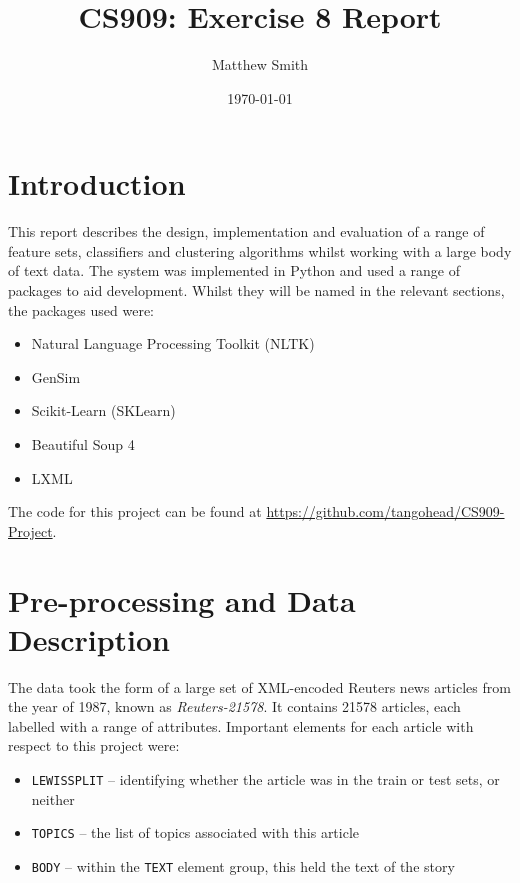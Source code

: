 \documentclass[11pt]{article}
\author{Matthew Smith}
\title{CS909: Exercise 8 Report}
\date{\today}
\begin{document}
\maketitle

\section{Introduction}
This report describes the design, implementation and evaluation of a range of feature sets, classifiers and clustering algorithms whilst working with a large body of text data. The system was implemented in Python and used a range of packages to aid development. Whilst they will be named in the relevant sections, the packages used were:
\begin{itemize}
\item Natural Language Processing Toolkit (NLTK)~\cite{nltk}
\item GenSim~\cite{gensim}
\item Scikit-Learn (SKLearn)~\cite{scikit-learn}
\item Beautiful Soup 4~\cite{bs4}
\item LXML~\cite{lxml}
\end{itemize}

The code for this project can be found at \url{https://github.com/tangohead/CS909-Project}.
\section{Pre-processing and Data Description}
\label{preproc}
The data took the form of a large set of XML-encoded Reuters news articles from the year of 1987, known as \emph{Reuters-21578}.  It contains 21578 articles, each labelled with a range of attributes. Important elements for each article with respect to this project were:
\begin{itemize}
\item \texttt{LEWISSPLIT} – identifying whether the article was in the train or test sets, or neither
\item \texttt{TOPICS} – the list of topics associated with this article
\item \texttt{BODY} – within the \texttt{TEXT} element group, this held the text of the story
\end{itemize}
\end{document}

